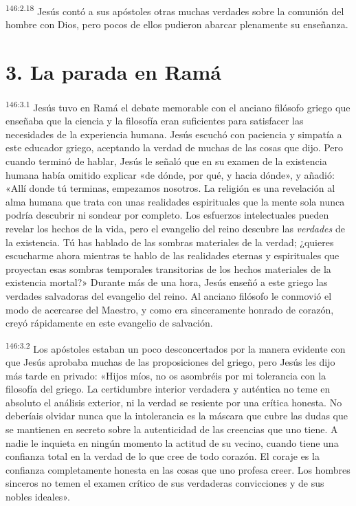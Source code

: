 \par
\textsuperscript{146:2.18} Jesús contó a sus apóstoles otras muchas verdades sobre la comunión del hombre con Dios, pero pocos de ellos pudieron abarcar plenamente su enseñanza.

\section*{3. La parada en Ramá}
\par
\textsuperscript{146:3.1} Jesús tuvo en Ramá el debate memorable con el anciano filósofo griego que enseñaba que la ciencia y la filosofía eran suficientes para satisfacer las necesidades de la experiencia humana. Jesús escuchó con paciencia y simpatía a este educador griego, aceptando la verdad de muchas de las cosas que dijo. Pero cuando terminó de hablar, Jesús le señaló que en su examen de la existencia humana había omitido explicar «de dónde, por qué, y hacia dónde», y añadió: «Allí donde tú terminas, empezamos nosotros. La religión es una revelación al alma humana que trata con unas realidades espirituales que la mente sola nunca podría descubrir ni sondear por completo. Los esfuerzos intelectuales pueden revelar los hechos de la vida, pero el evangelio del reino descubre las \textit{verdades} de la existencia. Tú has hablado de las sombras materiales de la verdad; ¿quieres escucharme ahora mientras te hablo de las realidades eternas y espirituales que proyectan esas sombras temporales transitorias de los hechos materiales de la existencia mortal?» Durante más de una hora, Jesús enseñó a este griego las verdades salvadoras del evangelio del reino. Al anciano filósofo le conmovió el modo de acercarse del Maestro, y como era sinceramente honrado de corazón, creyó rápidamente en este evangelio de salvación.

\par
\textsuperscript{146:3.2} Los apóstoles estaban un poco desconcertados por la manera evidente con que Jesús aprobaba muchas de las proposiciones del griego, pero Jesús les dijo más tarde en privado: «Hijos míos, no os asombréis por mi tolerancia con la filosofía del griego. La certidumbre interior verdadera y auténtica no teme en absoluto el análisis exterior, ni la verdad se resiente por una crítica honesta. No deberíais olvidar nunca que la intolerancia es la máscara que cubre las dudas que se mantienen en secreto sobre la autenticidad de las creencias que uno tiene. A nadie le inquieta en ningún momento la actitud de su vecino, cuando tiene una confianza total en la verdad de lo que cree de todo corazón. El coraje es la confianza completamente honesta en las cosas que uno profesa creer. Los hombres sinceros no temen el examen crítico de sus verdaderas convicciones y de sus nobles ideales».


